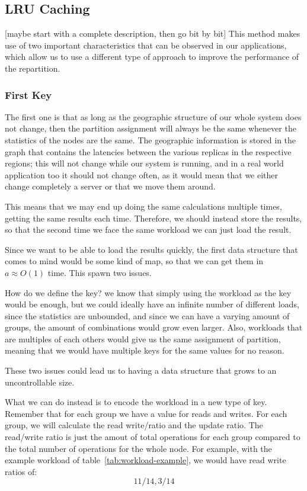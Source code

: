 \subsection{LRU Caching}\label{sec:lru-caching}
[maybe start with a complete description, then go bit by bit]
This method makes use of two important characteristics that can be observed in our applications, which allow us to use a different type of approach to improve the performance of the repartition.

\subsubsection{First Key}\label{sec:first-key}
The first one is that as long as the geographic structure of our whole system does not change, then the partition assignment will always be the same whenever the statistics of the nodes are the same. The geographic information is stored in the graph that contains the latencies between the various replicas in the respective regions; this will not change while our system is running, and in a real world application too it should not change often, as it would mean that we either change completely a server or that we move them around. 

This means that we may end up doing the same calculations multiple times, getting the same results each time. Therefore, we should instead store the results, so that the second time we face the same workload we can just load the result. 

Since we want to be able to load the results quickly, the first data structure that comes to mind would be some kind of map, so that we can get them in $a\approx O(1)$ time. This spawn two issues.

How do we define the key? we know that simply using the workload as the key would be enough, but we could ideally have an infinite number of different loads, since the statistics are unbounded, and since we can have a varying amount of groups, the amount of combinations would grow even larger. Also, workloads that are multiples of each others would give us the same assignment of partition, meaning that we would have multiple keys for the same values for no reason.

These two issues could lead us to having a data structure that grows to an uncontrollable size.

What we can do instead is to encode the workload in a new type of key. Remember that for each group we have a value for reads and writes. For each group, we will calculate the read write/ratio and the update ratio. The read/write ratio is just the amout of total operations for each group compared to the total number of operations for the whole node. For example, with the example workload of table~\ref{tab:workload-example}, we would have read write ratios of:
$$ 11/14, 3/14 $$

